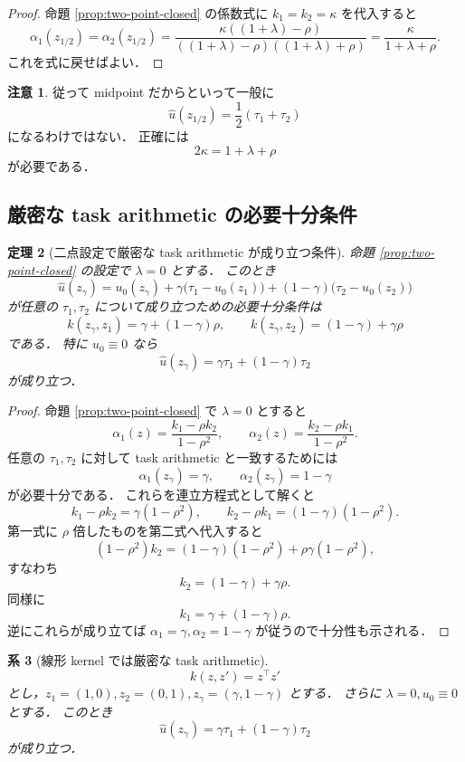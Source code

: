\documentclass[a4paper,11pt]{bxjsarticle}
\newtheorem{theorem}{定理}[section]
\newtheorem{corollary}[theorem]{系}
\theoremstyle{definition}
\newtheorem{remark}[theorem]{注意}
\begin{document}
\begin{proof}
命題 \ref{prop:two-point-closed} の係数式に $k_1=k_2=\kappa$ を代入すると
\[
\alpha_1(z_{1/2})=\alpha_2(z_{1/2})
=
\frac{\kappa((1+\lambda)-\rho)}{((1+\lambda)-\rho)((1+\lambda)+\rho)}
=
\frac{\kappa}{1+\lambda+\rho}.
\]
これを式に戻せばよい．
\end{proof}

\begin{remark}
従って midpoint だからといって一般に
\[
\hat u(z_{1/2})=\frac12(\tau_1+\tau_2)
\]
になるわけではない．
正確には
\[
2\kappa = 1+\lambda+\rho
\]
が必要である．
\end{remark}

\subsection{厳密な task arithmetic の必要十分条件}

\begin{theorem}[二点設定で厳密な task arithmetic が成り立つ条件]
\label{thm:exact-arithmetic-condition}
命題 \ref{prop:two-point-closed} の設定で $\lambda=0$ とする．
このとき
\[
\hat u(z_\gamma)=u_0(z_\gamma)+\gamma\bigl(\tau_1-u_0(z_1)\bigr)+(1-\gamma)\bigl(\tau_2-u_0(z_2)\bigr)
\]
が任意の $\tau_1,\tau_2$ について成り立つための必要十分条件は
\[
k(z_\gamma,z_1)=\gamma +(1-\gamma)\rho,
\qquad
k(z_\gamma,z_2)=(1-\gamma)+\gamma \rho
\]
である．
特に $u_0\equiv 0$ なら
\[
\hat u(z_\gamma)=\gamma\tau_1+(1-\gamma)\tau_2
\]
が成り立つ．
\end{theorem}

\begin{proof}
命題 \ref{prop:two-point-closed} で $\lambda=0$ とすると
\[
\alpha_1(z)=\frac{k_1-\rho k_2}{1-\rho^2},\qquad
\alpha_2(z)=\frac{k_2-\rho k_1}{1-\rho^2}.
\]
任意の $\tau_1,\tau_2$ に対して task arithmetic と一致するためには
\[
\alpha_1(z_\gamma)=\gamma,\qquad
\alpha_2(z_\gamma)=1-\gamma
\]
が必要十分である．
これらを連立方程式として解くと
\[
k_1-\rho k_2 = \gamma(1-\rho^2),\qquad
k_2-\rho k_1 = (1-\gamma)(1-\rho^2).
\]
第一式に $\rho$ 倍したものを第二式へ代入すると
\[
(1-\rho^2)k_2=(1-\gamma)(1-\rho^2)+\rho\gamma(1-\rho^2),
\]
すなわち
\[
k_2=(1-\gamma)+\gamma\rho.
\]
同様に
\[
k_1=\gamma +(1-\gamma)\rho.
\]
逆にこれらが成り立てば $\alpha_1=\gamma,\alpha_2=1-\gamma$ が従うので十分性も示される．
\end{proof}

\begin{corollary}[線形 kernel では厳密な task arithmetic]
\label{cor:linear-kernel}
\[
k(z,z')=z^\top z'
\]
とし，$z_1=(1,0), z_2=(0,1), z_\gamma=(\gamma,1-\gamma)$ とする．
さらに $\lambda=0, u_0\equiv 0$ とする．
このとき
\[
\hat u(z_\gamma)=\gamma\tau_1+(1-\gamma)\tau_2
\]
が成り立つ．
\end{corollary}
\end{document}
